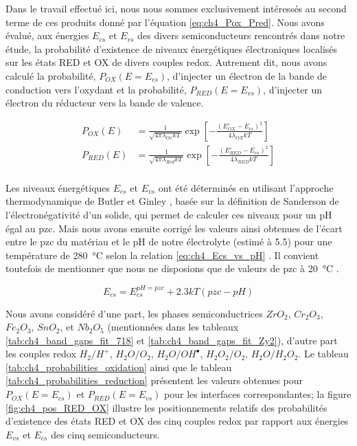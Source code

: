 \begin{refsection}
    Dans le travail effectué ici, nous nous sommes exclusivement intéressés au
    second terme de ces produits donné par l'équation \ref{eq:ch4_Pox_Pred}. Nous avons
    évalué, aux énergies $E_{cs}$ et $E_{vs}$ des divers semiconducteurs rencontrés dans notre étude, la probabilité d’existence de
    niveaux énergétiques électroniques localisés sur les états RED et OX de divers couples redox. Autrement dit, nous avons
    calculé la probabilité, $P_{OX}(E=E_{cs})$, d’injecter un électron de la bande de conduction vers l’oxydant et la probabilité,
    $P_{RED}(E=E_{vs})$, d’injecter un électron du réducteur vers la bande de valence. 

    \begin{equation}
        \begin{split}
            P_{OX}(E) &= \frac{1}{\sqrt{4\pi \lambda _{Ox}kT}}\exp \left[ -\frac{(E_{OX}^{\circ}-E_{cs})^2}{4\lambda
        _{OX} kT}
        \right] \\
        P_{RED}(E) &= \frac{1}{\sqrt{4\pi \lambda _{Red}kT}}\exp \left[ -\frac{(E_{RED}^{\circ}-E_{vs})^2}{4\lambda
    _{RED} kT}
        \right] \\
        \end{split}
        \label{eq:ch4_Pox_Pred}
    \end{equation}

    Les niveaux énergétiques $E_{cs}$ et $E_{vs}$ ont été déterminés en utilisant l’approche thermodynamique de Butler
    et Ginley
    \citep{Butler1978},
    basée sur la définition de Sanderson de l’électronégativité d’un solide, qui permet de calculer ces niveaux pour un pH
    égal au pzc. Mais nous avons ensuite corrigé les valeurs ainsi obtenues de l’écart entre le pzc du matériau et le pH de
    notre électrolyte (estimé à 5.5) pour une température de \SI{280}{\degreeCelsius} selon la relation \ref{eq:ch4_Ecs_vs_pH}
    \citep{Morrison1980}. Il convient toutefois de
    mentionner que nous ne disposions que de valeurs de pzc à \SI{20}{\degreeCelsius} \citep{Kosmulski2009}. 


    \begin{equation}
        E_{cs} = E_{cs}^{pH=pzc} + 2.3kT(pzc-pH)
        \label{eq:ch4_Ecs_vs_pH}
    \end{equation}    

    Nous avons considéré d’une part, les phases semiconductrices $ZrO_2$, $Cr_2O_3$, $Fe_2O_3$, $SnO_2$, et $Nb_2O_5$
    (mentionnées dans les
    tableaux \ref{tab:ch4_band_gaps_fit_718} et \ref{tab:ch4_band_gaps_fit_Zy2}),
    d’autre part les couples redox $H_2/H^+$, $H_2O/O_2$, $H_2O/OH^{\bullet}$,
    $H_2O_2/O_2$, $H_2O/H_2O_2$. 
    Le tableau \ref{tab:ch4_probabilities_oxidation} ainsi que le tableau \ref{tab:ch4_probabilities_reduction} 
    présentent les valeurs obtenues pour $P_{OX}(E=E_{cs})$ et $P_{RED}(E=E_{vs})$ pour les interfaces
    correspondantes; la figure \ref{fig:ch4_pos_RED_OX} illustre les positionnements relatifs
    des probabilités d’existence des états RED et OX
    des cinq couples redox  par rapport aux énergies $E_{vs}$ et $E_{cs}$ des cinq semiconducteurs.


\end{refsection}
